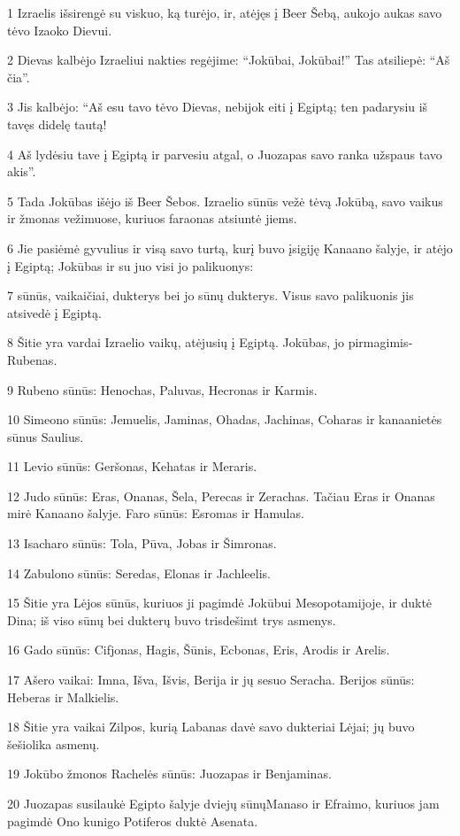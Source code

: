 \par 1 Izraelis išsirengė su viskuo, ką turėjo, ir, atėjęs į Beer Šebą, aukojo aukas savo tėvo Izaoko Dievui. 
\par 2 Dievas kalbėjo Izraeliui nakties regėjime: “Jokūbai, Jokūbai!” Tas atsiliepė: “Aš čia”. 
\par 3 Jis kalbėjo: “Aš esu tavo tėvo Dievas, nebijok eiti į Egiptą; ten padarysiu iš tavęs didelę tautą! 
\par 4 Aš lydėsiu tave į Egiptą ir parvesiu atgal, o Juozapas savo ranka užspaus tavo akis”. 
\par 5 Tada Jokūbas išėjo iš Beer Šebos. Izraelio sūnūs vežė tėvą Jokūbą, savo vaikus ir žmonas vežimuose, kuriuos faraonas atsiuntė jiems. 
\par 6 Jie pasiėmė gyvulius ir visą savo turtą, kurį buvo įsigiję Kanaano šalyje, ir atėjo į Egiptą; Jokūbas ir su juo visi jo palikuonys: 
\par 7 sūnūs, vaikaičiai, dukterys bei jo sūnų dukterys. Visus savo palikuonis jis atsivedė į Egiptą. 
\par 8 Šitie yra vardai Izraelio vaikų, atėjusių į Egiptą. Jokūbas, jo pirmagimis­Rubenas. 
\par 9 Rubeno sūnūs: Henochas, Paluvas, Hecronas ir Karmis. 
\par 10 Simeono sūnūs: Jemuelis, Jaminas, Ohadas, Jachinas, Coharas ir kanaanietės sūnus Saulius. 
\par 11 Levio sūnūs: Geršonas, Kehatas ir Meraris. 
\par 12 Judo sūnūs: Eras, Onanas, Šela, Perecas ir Zerachas. Tačiau Eras ir Onanas mirė Kanaano šalyje. Faro sūnūs: Esromas ir Hamulas. 
\par 13 Isacharo sūnūs: Tola, Pūva, Jobas ir Šimronas. 
\par 14 Zabulono sūnūs: Seredas, Elonas ir Jachleelis. 
\par 15 Šitie yra Lėjos sūnūs, kuriuos ji pagimdė Jokūbui Mesopotamijoje, ir duktė Dina; iš viso sūnų bei dukterų buvo trisdešimt trys asmenys. 
\par 16 Gado sūnūs: Cifjonas, Hagis, Šūnis, Ecbonas, Eris, Arodis ir Arelis. 
\par 17 Ašero vaikai: Imna, Išva, Išvis, Berija ir jų sesuo Seracha. Berijos sūnūs: Heberas ir Malkielis. 
\par 18 Šitie yra vaikai Zilpos, kurią Labanas davė savo dukteriai Lėjai; jų buvo šešiolika asmenų. 
\par 19 Jokūbo žmonos Rachelės sūnūs: Juozapas ir Benjaminas. 
\par 20 Juozapas susilaukė Egipto šalyje dviejų sūnų­Manaso ir Efraimo, kuriuos jam pagimdė Ono kunigo Potiferos duktė Asenata. 
